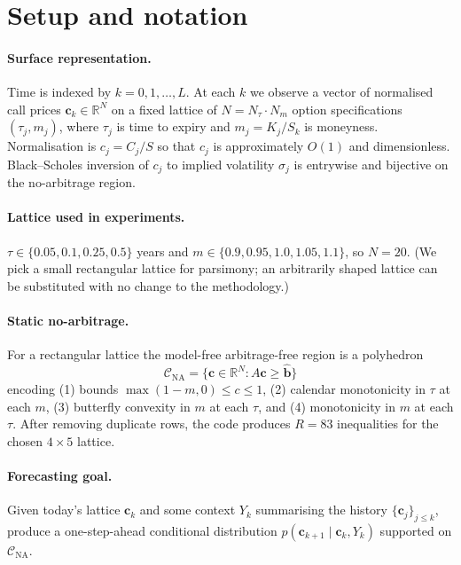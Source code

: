 \documentclass[11pt]{article}
\newcommand{\R}{\mathbb{R}}
\newcommand{\1}{\mathbf{1}}
\begin{document}
\section{Setup and notation}

\paragraph{Surface representation.}
Time is indexed by $k = 0, 1, \dots, L$. At each $k$ we observe a vector of normalised call prices $\mathbf c_k \in \R^N$ on a fixed lattice of $N = N_\tau \cdot N_m$ option specifications $(\tau_j, m_j)$, where $\tau_j$ is time to expiry and $m_j = K_j / S_k$ is moneyness. Normalisation is $c_j = C_j / S$ so that $c_j$ is approximately $O(1)$ and dimensionless. Black--Scholes inversion of $c_j$ to implied volatility $\sigma_j$ is entrywise and bijective on the no-arbitrage region.

\paragraph{Lattice used in experiments.}
$\tau \in \{0.05, 0.1, 0.25, 0.5\}$ years and $m \in \{0.9, 0.95, 1.0, 1.05, 1.1\}$, so $N = 20$. (We pick a small rectangular lattice for parsimony; an arbitrarily shaped lattice can be substituted with no change to the methodology.)

\paragraph{Static no-arbitrage.}
For a rectangular lattice the model-free arbitrage-free region is a polyhedron
\begin{equation}
\mathcal C_{\text{NA}} = \{\mathbf c \in \R^N : A \mathbf c \ge \mathbf{\hat b}\}
\label{eq:CNA}
\end{equation}
encoding (1) bounds $\max(1-m, 0) \le c \le 1$, (2) calendar monotonicity in $\tau$ at each $m$, (3) butterfly convexity in $m$ at each $\tau$, and (4) monotonicity in $m$ at each $\tau$. After removing duplicate rows, the code produces $R = 83$ inequalities for the chosen $4\times 5$ lattice.

\paragraph{Forecasting goal.}
Given today's lattice $\mathbf c_k$ and some context $Y_k$ summarising the history $\{\mathbf c_j\}_{j \le k}$, produce a one-step-ahead conditional distribution $p(\mathbf c_{k+1} \mid \mathbf c_k, Y_k)$ supported on $\mathcal C_{\text{NA}}$.
\end{document}
